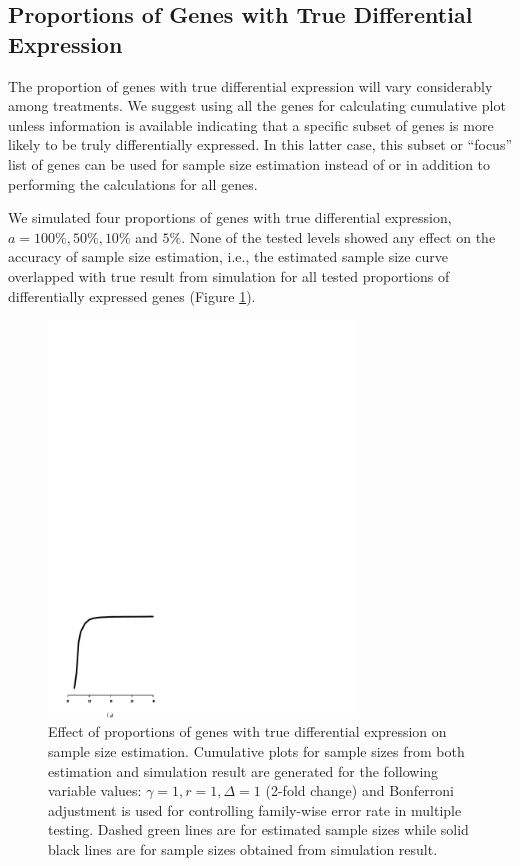 \documentclass{bioinfo}
\begin{document}
\subsection{Proportions of Genes with True Differential Expression}

The proportion of genes with true differential expression will
vary considerably among treatments. We suggest using all the genes
for calculating cumulative plot unless information is available
indicating that a specific subset of genes is more likely to be
truly differentially expressed. In this latter case, this subset
or ``focus'' list of genes can be used for sample size estimation
instead of or in addition to performing the calculations for all
genes.

We simulated four proportions of genes with true differential
expression, $a = 100\%, 50\%, 10\%$ and $5\%$. None of the tested
levels showed any effect on the accuracy of sample size
estimation, i.e., the estimated sample size curve overlapped with
true result from simulation for all tested proportions of
differentially expressed genes (Figure \ref{fig:ResAlt}).

\begin{figure}[h]
  \centerline{\includegraphics*[width=3.2in]{ResAlt.pdf}}
  \caption[Effect of proportions of genes with true differential expression on sample size estimation]
  {Effect of proportions of genes with true differential expression on sample size estimation.
    Cumulative plots for sample sizes from both estimation and simulation result
    are generated for the following variable values: $\gamma = 1, r = 1, \Delta = 1$ (2-fold
    change) and Bonferroni adjustment is used for controlling family-wise error rate in multiple testing. Dashed green lines are for estimated sample sizes
    while solid black lines are for sample sizes obtained from simulation result.}
  \label{fig:ResAlt}
\end{figure}
\end{document}
